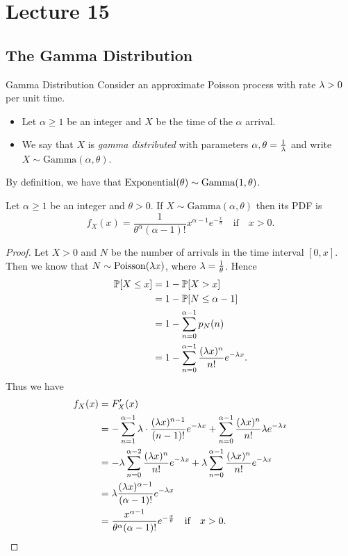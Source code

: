 \documentclass[class=article, crop=false]{standalone}
\begin{document}
  \section{Lecture 15}
  \subsection{The Gamma Distribution}
  \begin{definition}{Gamma Distribution}
    Consider an approximate Poisson process with rate $\lambda > 0$ per unit time.
    \begin{itemize}
      \item Let $\alpha \geq 1$ be an integer and $X$ be the time of the $\alpha$ arrival.
      \item We say that $X$ is \emph{gamma distributed} with parameters $\alpha, \theta = \frac{1}{\lambda}$ and write $X\sim \mathrm{Gamma}(\alpha, \theta)$.
    \end{itemize}
  \end{definition}
  \begin{note}{}
    By definition, we have that $\operatorname{Exponential}(\theta)\sim \mathrm{Gamma}(1, \theta)$.
  \end{note}
  \begin{theorem}{}
    Let $\alpha \geq 1$ be an integer and $\theta > 0$. If $X\sim \mathrm{Gamma}(\alpha, \theta)$ then its PDF is
    \[
      f_X(x) = \frac{1}{\theta^\alpha(\alpha - 1)!}x^{\alpha - 1}e^{-\frac{x}{\theta}}\quad\text{if}\quad x > 0.
    \]
    \begin{proof}
      Let $X > 0$ and $N$ be the number of arrivals in the time interval $[0, x]$. Then we know that $N\sim \operatorname{Poisson}(\lambda x)$, where $\lambda = \frac{1}{\theta}$. Hence
      \begin{align*}
        \mathbb{P}[X \leq x] &= 1 - \mathbb{P}[X > x] \\
                     &= 1 - \mathbb{P}[N \leq \alpha - 1] \\
                     &= 1 - \sum_{n=0}^{\alpha - 1} p_N(n) \\
                     &= 1 - \sum_{n=0}^{\alpha - 1} \frac{(\lambda x)^n}{n!}e^{-\lambda x}.
      \end{align*}
      Thus we have
      \begin{align*}
        f_X(x) &= F_X'(x) \\
               &= -\sum_{n=1}^{\alpha - 1} \lambda\cdot \frac{(\lambda x)^{n - 1}}{(n - 1)!}e^{-\lambda x} + \sum_{n=0}^{\alpha - 1} \frac{(\lambda x)^n}{n!} \lambda e^{-\lambda x} \\
               &= -\lambda \sum_{n=0}^{\alpha - 2} \frac{(\lambda x)^n}{n!}e^{-\lambda x} + \lambda \sum_{n=0}^{\alpha - 1} \frac{(\lambda x)^n}{n!}e^{-\lambda x} \\
               &= \lambda \frac{(\lambda x)^{\alpha - 1}}{(\alpha - 1)!}e^{-\lambda x} \\
               &= \frac{x^{\alpha - 1}}{\theta^\alpha(\alpha - 1)!}e^{-\frac{x}{\theta}}\quad\text{if}\quad x > 0.
      \end{align*}
    \end{proof}
  \end{theorem}
\end{document}
